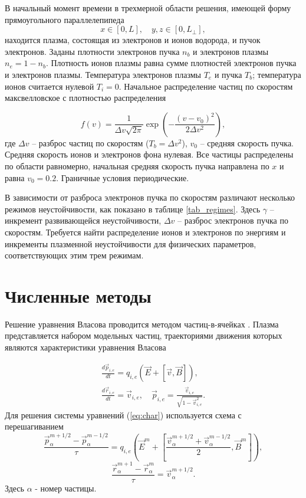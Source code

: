 В начальный момент времени в трехмерной области
решения, имеющей форму прямоугольного параллелепипеда $$
x\in[0,L],\quad y,z\in[0,L_\bot], $$ находится плазма, состоящая из
электронов и ионов водорода, и пучок электронов. Заданы плотности электронов пучка $n_b$ и электронов плазмы $n_e = 1-n_b$. Плотность ионов плазмы равна сумме плотностей электронов пучка и электронов плазмы. Температура электронов плазмы $T_e$ и пучка $T_b$; температура ионов считается нулевой $T_i=0$. Начальное распределение частиц по скоростям макс\-вел\-ловс\-кое с плотностью распределения

$$
f(v)=\frac{1}{\Delta v \sqrt{2
		\pi}}\exp \left( {-\frac{(v-v_0)^2}{2 \Delta v^2}}\right) ,
$$
где $\Delta v$ -- разброс частиц по скоростям ($T_b=\Delta v^2$), $v_0$ -- средняя
скорость пучка. Средняя скорость ионов и электронов фона нулевая. Все частицы распределены по области равномерно, начальная средняя скорость пучка направлена по $x$ и равна $v_0=0.2$. Граничные условия периодические. 





В зависимости от разброса электронов пучка по скоростям различают несколько режимов неустойчивости, как показано в таблице \ref{tab_regimes}. Здесь $\gamma$ --  инкремент развивающейся неустойчивости, $\Delta v $ -- разброс электронов пучка по скоростям. Требуется найти распределение ионов и электронов по энергиям и инкременты плазменной неустойчивости для физических параметров, соответствующих этим трем режимам.



\section{Численные методы}


Решение уравнения Власова проводится методом
частиц-в-ячейках \cite{VshivkovPICbook}. Плазма представляется набором модельных частиц, траекториями движения которых являются характеристики урав\-не\-ния Власова

\begin{eqnarray}\label{eq:char}
\frac{d \vec{p} _{i,e}}{d t}=q_{i,e}(\vec{E}+[\vec{v},\vec{B}]),
\\
\frac{d \vec{r} _{i,e}}{d t}=\vec{v}_{i,e}, \quad \vec{p}_{i,e}=\frac{\vec{v}_{i,e}}{\sqrt{1-\vec{v}_{i,e}^2}}.\nonumber
\end{eqnarray}
Для решения системы уравнений (\ref{eq:char}) используется схема с перешагиванием 
$$
\frac{\vec{p}^{m+1/2}_\alpha-\vec{p}^{m-1/2}_\alpha}{\tau}=q_{i,e}\left({\vec{E}}^m+\left[\frac{{\vec{v}}^{m+1/2}_\alpha+{\vec{v}}^{m-1/2}_\alpha}{2},{\vec{B}}^m \right] \right),
$$
$$
\frac{{\vec{r}}_\alpha^{m+1}-{\vec{r}}_\alpha^{m}}{\tau}={\vec{v}}^{m+1/2}_\alpha.
$$
Здесь $\alpha$ - номер частицы.

